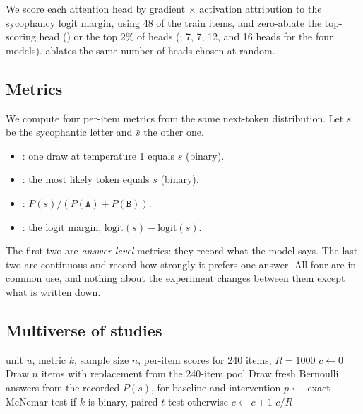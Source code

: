 We score each attention head by gradient $\times$ activation attribution to the sycophancy logit margin, using 48 of the train items, and zero-ablate the top-scoring head () or the top 2\% of heads (; 7, 7, 12, and 16 heads for the four models).
 ablates the same number of heads chosen at random.

\subsection{Metrics}

We compute four per-item metrics from the same next-token distribution.
Let $s$ be the sycophantic letter and $\bar{s}$ the other one.
\begin{itemize}[leftmargin=*,itemsep=0pt,topsep=0pt]
    \item \msample: one draw at temperature 1 equals $s$ (binary).
    \item \mgreedy: the most likely token equals $s$ (binary).
    \item \mprob: $P(s) / (P(\texttt{A}) + P(\texttt{B}))$.
    \item \mlogit: the logit margin, $\mathrm{logit}(s) - \mathrm{logit}(\bar{s})$.
\end{itemize}
The first two are \emph{answer-level} metrics: they record what the model says.
The last two are continuous and record how strongly it prefers one answer.
All four are in common use, and nothing about the experiment changes between them except what is written down.

\subsection{Multiverse of studies}

\begin{algorithm}[t]
\caption{Null rate of one design cell}
\label{alg:multiverse}
\begin{algorithmic}[1]
\Require unit $u$, metric $k$, sample size $n$, per-item scores for 240 items, $R = 1000$
\State $c \gets 0$
    \State Draw $n$ items with replacement from the 240-item pool
        \State Draw fresh Bernoulli answers from the recorded $P(s)$, for baseline and intervention
    \EndIf
    \State $p \gets$ exact McNemar test if $k$ is binary, paired $t$-test otherwise 
        \State $c \gets c + 1$ 
    \EndIf
\EndFor
\State \Return $c / R$
\end{algorithmic}
\end{algorithm}

